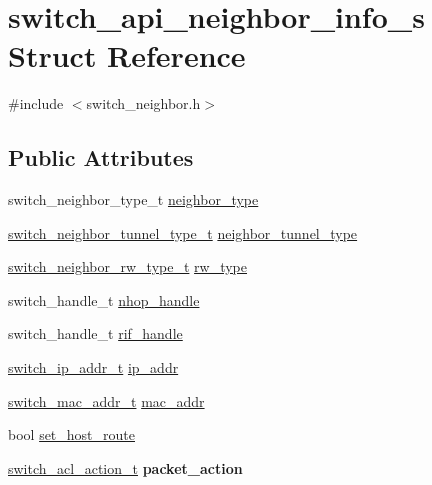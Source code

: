 \hypertarget{structswitch__api__neighbor__info__s}{\section{switch\+\_\+api\+\_\+neighbor\+\_\+info\+\_\+s Struct Reference}
\label{structswitch__api__neighbor__info__s}
}


{\ttfamily \#include $<$switch\+\_\+neighbor.\+h$>$}

\subsection*{Public Attributes}
\begin{DoxyCompactItemize}
\item 
switch\+\_\+neighbor\+\_\+type\+\_\+t \hyperlink{structswitch__api__neighbor__info__s_a587f869ccbe75eab1d13f314eb7fcfcd}{neighbor\+\_\+type}
\item 
\hyperlink{group__ARP_gaf9904c6d66d51eba396e678466e3ef45}{switch\+\_\+neighbor\+\_\+tunnel\+\_\+type\+\_\+t} \hyperlink{structswitch__api__neighbor__info__s_a0f2000eaed4a5f7e37094fafd2d95190}{neighbor\+\_\+tunnel\+\_\+type}
\item 
\hyperlink{group__ARP_gac9c559935317c4845662f75ef6f8fa3a}{switch\+\_\+neighbor\+\_\+rw\+\_\+type\+\_\+t} \hyperlink{structswitch__api__neighbor__info__s_a27c9a28ac5378b9e0f2638ff57eed787}{rw\+\_\+type}
\item 
switch\+\_\+handle\+\_\+t \hyperlink{structswitch__api__neighbor__info__s_acd7fae341c7be9538cacef9eaa67a159}{nhop\+\_\+handle}
\item 
switch\+\_\+handle\+\_\+t \hyperlink{structswitch__api__neighbor__info__s_afe7ed2322594f75b01860aee058fb644}{rif\+\_\+handle}
\item 
\hyperlink{structswitch__ip__addr__s}{switch\+\_\+ip\+\_\+addr\+\_\+t} \hyperlink{structswitch__api__neighbor__info__s_a1440c1ce95707fbef3201f84a0ca5427}{ip\+\_\+addr}
\item 
\hyperlink{structswitch__mac__addr__s}{switch\+\_\+mac\+\_\+addr\+\_\+t} \hyperlink{structswitch__api__neighbor__info__s_a874746e95d7bb993ec0c1aa0db289010}{mac\+\_\+addr}
\item 
bool \hyperlink{structswitch__api__neighbor__info__s_a574b24b2a4b7b8fa2bec4019f0938238}{set\+\_\+host\+\_\+route}
\item 
\hypertarget{structswitch__api__neighbor__info__s_a2836d41e2c8cfabb06ae668c32536006}{\hyperlink{group__ACL_ga9e512fe793010aac7829bb2fbef4764d}{switch\+\_\+acl\+\_\+action\+\_\+t} {\bfseries packet\+\_\+action}}\label{structswitch__api__neighbor__info__s_a2836d41e2c8cfabb06ae668c32536006}

\end{DoxyCompactItemize}


